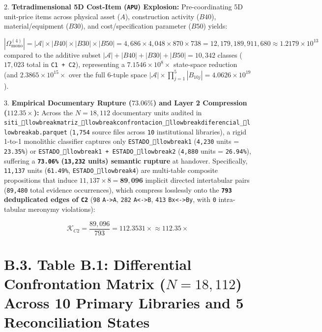 \documentclass[10pt,a4paper]{article}
\begin{document}
2. \textbf{Tetradimensional 5D Cost-Item (\texttt{APU}) Explosion:} Pre-coordinating 5D unit-price items across physical asset ($A$), construction activity ($B40$), material/equipment ($B30$), and cost/specification parameter ($B50$) yields:\par
\begin{equation*}
|\Omega_{\text{mono}}^{(4)}| = |\mathcal{A}| \times |B40| \times |B30| \times |B50| = 4,686 \times 4,048 \times 870 \times 738 = 12,179,189,911,680 \approx 1.2179 \times 10^{13}
\end{equation*}
compared to the additive subset $|\mathcal{A}| + |B40| + |B30| + |B50| = 10,342$ classes ($17,023$ total in \texttt{C1 + C2}), representing a \textbf{$7.1546 \times 10^{8}\times$} state-space reduction (and \textbf{$2.3865 \times 10^{15}\times$} over the full 6-tuple space $|\mathcal{A}| \times \prod_{j=1}^{5} |B_{10j}| = 4.0626 \times 10^{19}$).

3. \textbf{Empirical Documentary Rupture ($73.06\%$) and Layer 2 Compression ($112.35\times$):} Across the $N = 18,112$ documentary units audited in \texttt{siti\_llowbreak{}matriz\_llowbreak{}confrontacion\_llowbreak{}diferencial\_llowbreak{}ab.parquet} (\texttt{1,754} source files across \texttt{10} institutional libraries), a rigid 1-to-1 monolithic classifier captures only \texttt{ESTADO\_llowbreak{}1} (\texttt{4,230} units = \texttt{23.35\%}) or \texttt{ESTADO\_llowbreak{}1 + ESTADO\_llowbreak{}2} (\texttt{4,880} units = \texttt{26.94\%}), suffering a \textbf{\texttt{73.06\%} (\texttt{13,232} units) semantic rupture} at handover. Specifically, \texttt{11,137} units (\texttt{61.49\%}, \texttt{ESTADO\_llowbreak{}4}) are multi-table composite propositions that induce $11,137 \times 8 = \mathbf{89,096}$ implicit directed intertabular pairs (\texttt{89,480} total evidence occurrences), which compress losslessly onto the \textbf{\texttt{793} deduplicated edges of \texttt{C2}} (\texttt{98} \texttt{A->A}, \texttt{282} \texttt{A<->B}, \texttt{413} \texttt{Bx<->By}, with \texttt{0} intra-tabular meronymy violations):\par
\begin{equation*}
\mathcal{K}_{C2} = \frac{89,096}{793} = \mathbf{112.3531\times} \approx \mathbf{112.35\times}
\end{equation*}



\section*{B.3. Table B.1: Differential Confrontation Matrix ($N = 18,112$) Across 10 Primary Libraries and 5 Reconciliation States}
\end{document}

